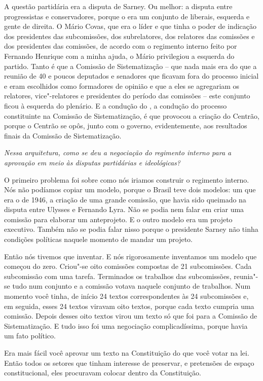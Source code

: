 A questão partidária era a disputa de Sarney. Ou melhor:
a disputa entre progressistas e conservadores, porque o  era um
conjunto de liberais, esquerda e gente de direita. O Mário Covas, que
era o líder e que tinha o poder de indicação dos presidentes das
subcomissões, dos subrelatores, dos relatores das comissões e dos
presidentes das comissões, de acordo com o regimento interno feito por
Fernando Henrique com a minha ajuda, o Mário privilegiou a esquerda do
partido. Tanto é que a Comissão de Sistematização -- que nada mais era
do que a reunião de 40 e poucos deputados e senadores que ficavam fora
do processo inicial e eram escolhidos como formadores de opinião e que a
eles se agregariam os relatores, vice"-relatores e presidentes do período
das comissões -- este conjunto ficou à esquerda do plenário. E a
condução do , a condução do processo constituinte na Comissão de
Sistematização, é que provocou a criação do Centrão, porque o Centrão se
opôs, junto com o governo, evidentemente, aos resultados finais da
Comissão de Sistematização.

\medskip

\emph{Nessa arquitetura, como se deu a negociação do regimento interno
para a aprovação em meio às disputas partidárias e ideológicas?}

O primeiro problema foi sobre como nós iriamos construir
o regimento interno. Nós não podíamos copiar um modelo, porque o Brasil
teve dois modelos: um que era o de 1946, a criação de uma grande
comissão, que havia sido queimado na disputa entre Ulysses e Fernando
Lyra. Não se podia nem falar em criar uma comissão para elaborar um
anteprojeto. E o outro modelo era um projeto executivo. Também não se
podia falar nisso porque o presidente Sarney não tinha condições
políticas naquele momento de mandar um projeto.

Então nós tivemos que inventar. E nós rigorosamente inventamos um modelo
que começou do zero. Criou"-se oito comissões compostas de 21
subcomissões. Cada subcomissão com uma tarefa. Terminados os trabalhos
das subcomissões, reunia"-se tudo num conjunto e a comissão votava
naquele conjunto de trabalhos. Num momento você tinha, de início 24
textos correspondentes às 24 subcomissões e, em seguida, esses 24 textos
viravam oito textos, porque cada texto cumpria uma comissão. Depois
desses oito textos virou um texto só que foi para a Comissão de
Sistematização. E tudo isso foi uma negociação complicadíssima, porque
havia um fato político.

Era mais fácil você aprovar um texto na Constituição do que você votar
na lei. Então todos os setores que tinham interesse de preservar, e
pretensões de espaço constitucional, eles procuravam colocar dentro da
Constituição.

